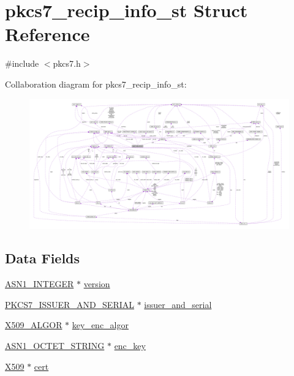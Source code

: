 \hypertarget{structpkcs7__recip__info__st}{}\section{pkcs7\+\_\+recip\+\_\+info\+\_\+st Struct Reference}
\label{structpkcs7__recip__info__st}


{\ttfamily \#include $<$pkcs7.\+h$>$}



Collaboration diagram for pkcs7\+\_\+recip\+\_\+info\+\_\+st\+:\nopagebreak
\begin{figure}[H]
\begin{center}
\leavevmode
\includegraphics[width=350pt]{structpkcs7__recip__info__st__coll__graph}
\end{center}
\end{figure}
\subsection*{Data Fields}
\begin{DoxyCompactItemize}
\item 
\hyperlink{crypto_2ossl__typ_8h_af4335399bf9774cb410a5e93de65998b}{A\+S\+N1\+\_\+\+I\+N\+T\+E\+G\+ER} $\ast$ \hyperlink{structpkcs7__recip__info__st_abf367aeef355b6acf5be7c569c4b28b0}{version}
\item 
\hyperlink{crypto_2pkcs7_2pkcs7_8h_a3f5400dcd95708494b81eaae75743fcf}{P\+K\+C\+S7\+\_\+\+I\+S\+S\+U\+E\+R\+\_\+\+A\+N\+D\+\_\+\+S\+E\+R\+I\+AL} $\ast$ \hyperlink{structpkcs7__recip__info__st_ac70f87eb66589d0b69550ea4e8d46c93}{issuer\+\_\+and\+\_\+serial}
\item 
\hyperlink{crypto_2ossl__typ_8h_aa2b6185e6254f36f709cd6577fb5022e}{X509\+\_\+\+A\+L\+G\+OR} $\ast$ \hyperlink{structpkcs7__recip__info__st_a7523836c2fa5d4ca4e69896865bf8e9d}{key\+\_\+enc\+\_\+algor}
\item 
\hyperlink{crypto_2ossl__typ_8h_afbd05e94e0f0430a2b729473efec88c1}{A\+S\+N1\+\_\+\+O\+C\+T\+E\+T\+\_\+\+S\+T\+R\+I\+NG} $\ast$ \hyperlink{structpkcs7__recip__info__st_a723a4a8e5a70c01d3670bdfdb0d1ab9b}{enc\+\_\+key}
\item 
\hyperlink{crypto_2ossl__typ_8h_a4f666bde6518f95deb3050c54b408416}{X509} $\ast$ \hyperlink{structpkcs7__recip__info__st_a2fb0a168ce33f1f9ce519813d94887f0}{cert}
\end{DoxyCompactItemize}


